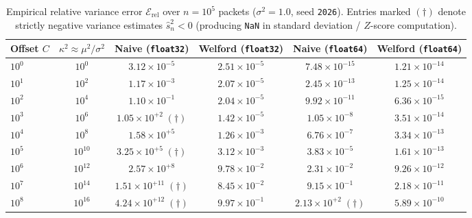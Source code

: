 \documentclass[oneside,noexaminfo,english]{sapthesis}
\numberwithin{equation}{section}
\numberwithin{figure}{section}
\numberwithin{table}{section}
\theoremstyle{compactplain}
\theoremstyle{compactdef}
\theoremstyle{compactrem}
\begin{document}
\begin{table}[!htbp]
\centering
\caption{Empirical relative variance error $\mathcal{E}_{\mathrm{rel}}$ over $n = 10^5$ packets ($\sigma^2 = 1.0$, seed \texttt{2026}). Entries marked $(\dagger)$ denote strictly negative variance estimates $\hat{s}_n^2 < 0$ (producing \texttt{NaN} in standard deviation / $Z$-score computation).}
\label{tab:welford_benchmark}
\footnotesize
\begin{tabular*}{\textwidth}{@{\extracolsep{\fill}}lccccc@{}}
\toprule
\textbf{Offset} $C$ & \textbf{$\kappa^2 \approx \mu^2/\sigma^2$} & \textbf{Naive (\texttt{float32})} & \textbf{Welford (\texttt{float32})} & \textbf{Naive (\texttt{float64})} & \textbf{Welford (\texttt{float64})} \\
\midrule
$10^0$ & $10^0$  & $3.12 \times 10^{-5}$ & $2.51 \times 10^{-5}$ & $7.48 \times 10^{-15}$ & $1.21 \times 10^{-14}$ \\
$10^1$ & $10^2$  & $1.17 \times 10^{-3}$ & $2.07 \times 10^{-5}$ & $2.45 \times 10^{-13}$ & $1.25 \times 10^{-14}$ \\
$10^2$ & $10^4$  & $1.10 \times 10^{-1}$ & $2.04 \times 10^{-5}$ & $9.92 \times 10^{-11}$ & $6.36 \times 10^{-15}$ \\
$10^3$ & $10^6$  & $1.05 \times 10^{+2}\;(\dagger)$ & $1.42 \times 10^{-5}$ & $1.05 \times 10^{-8}$  & $3.51 \times 10^{-14}$ \\
$10^4$ & $10^8$  & $1.58 \times 10^{+5}$ & $1.26 \times 10^{-3}$ & $6.76 \times 10^{-7}$  & $3.34 \times 10^{-13}$ \\
$10^5$ & $10^{10}$ & $3.25 \times 10^{+5}\;(\dagger)$ & $3.12 \times 10^{-3}$ & $3.83 \times 10^{-5}$  & $1.61 \times 10^{-13}$ \\
$10^6$ & $10^{12}$ & $2.57 \times 10^{+8}$ & $9.78 \times 10^{-2}$ & $2.31 \times 10^{-2}$  & $9.26 \times 10^{-12}$ \\
$10^7$ & $10^{14}$ & $1.51 \times 10^{+11}\;(\dagger)$ & $8.45 \times 10^{-2}$ & $9.15 \times 10^{-1}$  & $2.18 \times 10^{-11}$ \\
$10^8$ & $10^{16}$ & $4.24 \times 10^{+12}\;(\dagger)$ & $9.97 \times 10^{-1}$ & $2.13 \times 10^{+2}\;(\dagger)$ & $5.89 \times 10^{-10}$ \\
\bottomrule
\end{tabular*}
\end{table}
\end{document}
